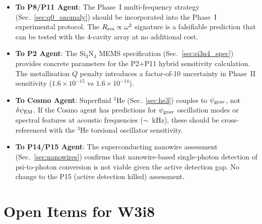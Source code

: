 \documentclass[11pt]{article}
\theoremstyle{definition}
\theoremstyle{remark}
\newcommand{\ee}[1]{\times 10^{#1}}
\newcommand{\psigrav}{\psi_{\rm grav}}
\newcommand{\psiEM}{\delta\psi_{\rm EM}}
\begin{document}
\begin{itemize}[nosep]
  \item \textbf{To P8/P11 Agent}: The Phase~I multi-frequency strategy
    (Sec.~\ref{sec:q0_anomaly}) should be incorporated into the Phase~I
    experimental protocol. The $R_{\rm res} \propto \omega^2$ signature
    is a falsifiable prediction that can be tested with the 4-cavity
    array at no additional cost.

  \item \textbf{To P2 Agent}: The Si$_3$N$_4$ MEMS specification
    (Sec.~\ref{sec:si3n4_spec}) provides concrete parameters for the
    P2+P11 hybrid sensitivity calculation. The metallisation $Q$ penalty
    introduces a factor-of-10 uncertainty in Phase~II sensitivity
    ($1.6\ee{-15}$ vs $1.6\ee{-14}$).

  \item \textbf{To Cosmo Agent}: Superfluid $^3$He (Sec.~\ref{sec:he3})
    couples to $\psigrav$, not $\psiEM$. If the Cosmo agent has
    predictions for $\psigrav$ oscillation modes or spectral features
    at acoustic frequencies ($\sim$~kHz), these should be cross-referenced
    with the $^3$He torsional oscillator sensitivity.

  \item \textbf{To P14/P15 Agent}: The superconducting nanowire
    assessment (Sec.~\ref{sec:nanowires}) confirms that nanowire-based
    single-photon detection of psi-to-photon conversion is not viable
    given the active detection gap. No change to the P15 (active
    detection killed) assessment.
\end{itemize}


\section{Open Items for W3i8}
\label{sec:open}
\end{document}
